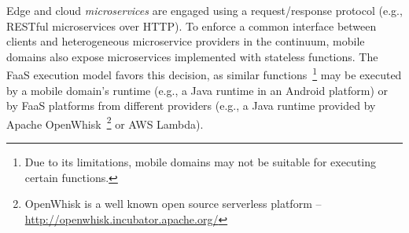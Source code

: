Edge and cloud \textit{microservices} are engaged using a request/response protocol (e.g., RESTful microservices over HTTP). To enforce a common interface between clients and heterogeneous microservice providers in the continuum, mobile domains also expose microservices implemented with stateless functions. The FaaS execution model favors this decision, as similar functions~\footnote{Due to its limitations, mobile domains may not be suitable for executing certain functions.} may be executed by a mobile domain's runtime (e.g., a Java runtime in an Android platform) or by FaaS platforms from different providers (e.g., a Java runtime provided by Apache OpenWhisk~\footnote{OpenWhisk is a well known open source serverless platform -- \url{http://openwhisk.incubator.apache.org/}} or AWS Lambda).









